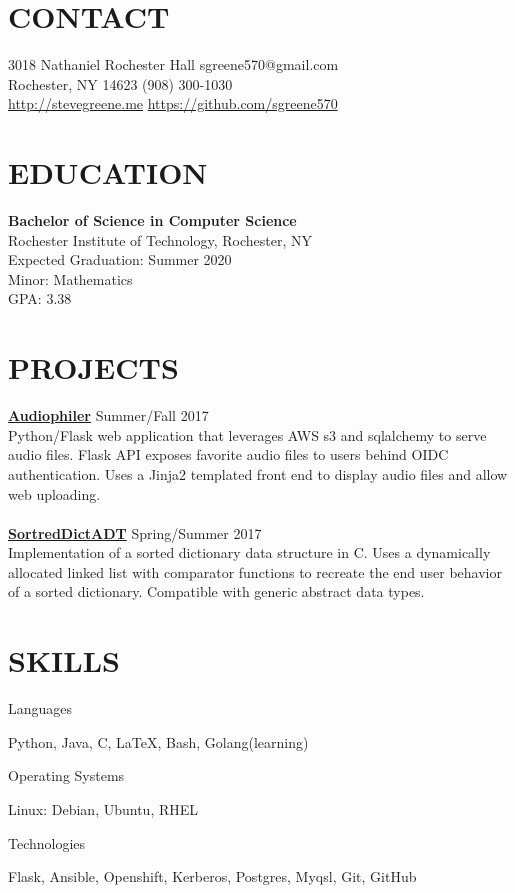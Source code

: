 \documentclass[line, margin]{res}
\begin{document}

\begin{resume}

\section {CONTACT}
3018 Nathaniel Rochester Hall \hfill sgreene570@gmail.com \\
Rochester, NY 14623 \hfill (908) 300-1030 \\
\url{http://stevegreene.me} \hfill \url{https://github.com/sgreene570}

\section{EDUCATION}
{\bf Bachelor of Science in Computer Science} \\
Rochester Institute of Technology, Rochester, NY \\
Expected Graduation: Summer 2020 \\
Minor: Mathematics \\
GPA: 3.38

\section{PROJECTS}
{\bf \href{https://github.com/sgreene570/audiophiler}{Audiophiler}} \hfill Summer/Fall 2017 \\
Python/Flask web application that leverages AWS s3 and sqlalchemy to serve audio
files.  Flask API exposes favorite audio files to users behind OIDC authentication.
Uses a Jinja2 templated front end to display audio files and allow web uploading.
\\
\\
{\bf \href{https://github.com/sgreene570/SortedDictADT}{SortredDictADT}} \hfill Spring/Summer 2017 \\
Implementation of a sorted dictionary data structure in C.  Uses a dynamically allocated linked list with comparator functions
to recreate the end user behavior of a sorted dictionary.  Compatible with generic abstract data types.

\section{SKILLS}
\begin{compactdesc}
    \item[Languages] \begin{inparaenum} {Python, Java, C, \LaTeX, Bash, Golang(learning)} \end{inparaenum}
    \item[Operating Systems] \begin{inparaenum} {Linux: Debian, Ubuntu, RHEL} \end{inparaenum}
    \item[Technologies] \begin{inparaenum} {Flask, Ansible, Openshift, Kerberos, Postgres, Myqsl, Git, GitHub} \end{inparaenum}
\end{compactdesc}


\end{resume}
\end{document}
